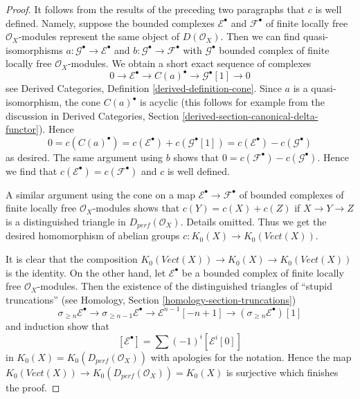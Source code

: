 \begin{proof}
\medskip\noindent
It follows from the results of the preceding two paragraphs that $c$
is well defined. Namely, suppose the bounded complexes
$\mathcal{E}^\bullet$ and $\mathcal{F}^\bullet$ of finite locally free
$\mathcal{O}_X$-modules represent the same object of $D(\mathcal{O}_X)$.
Then we can find quasi-isomorphisms
$a : \mathcal{G}^\bullet \to \mathcal{E}^\bullet$ and
$b : \mathcal{G}^\bullet \to \mathcal{F}^\bullet$
with $\mathcal{G}^\bullet$ bounded complex of finite locally free
$\mathcal{O}_X$-modules.
We obtain a short exact sequence of complexes
$$
0 \to \mathcal{E}^\bullet \to C(a)^\bullet \to \mathcal{G}^\bullet[1] \to 0
$$
see Derived Categories, Definition \ref{derived-definition-cone}.
Since $a$ is a quasi-isomorphism, the cone $C(a)^\bullet$ is
acyclic (this follows for example from the discussion in
Derived Categories, Section \ref{derived-section-canonical-delta-functor}).
Hence
$$
0 = c(C(a)^\bullet) = c(\mathcal{E}^\bullet) + c(\mathcal{G}^\bullet[1]) =
c(\mathcal{E}^\bullet) - c(\mathcal{G}^\bullet)
$$
as desired. The same argument using $b$ shows that
$0 = c(\mathcal{F}^\bullet) - c(\mathcal{G}^\bullet)$.
Hence we find that $c(\mathcal{E}^\bullet) = c(\mathcal{F}^\bullet)$
and $c$ is well defined.

\medskip\noindent
A similar argument using the cone on a map
$\mathcal{E}^\bullet \to \mathcal{F}^\bullet$
of bounded complexes of finite locally free $\mathcal{O}_X$-modules
shows that $c(Y) = c(X) + c(Z)$ if $X \to Y \to Z$ is a distinguished triangle
in $D_{perf}(\mathcal{O}_X)$. Details omitted.
Thus we get the desired homomorphism
of abelian groups $c : K_0(X) \to K_0(\textit{Vect}(X))$.

\medskip\noindent
It is clear that the composition
$K_0(\textit{Vect}(X)) \to K_0(X) \to K_0(\textit{Vect}(X))$
is the identity. On the other hand, let $\mathcal{E}^\bullet$
be a bounded complex of finite locally free $\mathcal{O}_X$-modules.
Then the existence of the distinguished triangles
of ``stupid truncations''
(see Homology, Section \ref{homology-section-truncations})
$$
\sigma_{\geq n}\mathcal{E}^\bullet \to
\sigma_{\geq n - 1}\mathcal{E}^\bullet \to
\mathcal{E}^{n - 1}[-n + 1] \to
(\sigma_{\geq n}\mathcal{E}^\bullet)[1]
$$
and induction show that
$$
[\mathcal{E}^\bullet] = \sum (-1)^i[\mathcal{E}^i[0]]
$$
in $K_0(X) = K_0(D_{perf}(\mathcal{O}_X))$ with apologies for the notation.
Hence the map $K_0(\textit{Vect}(X)) \to K_0(D_{perf}(\mathcal{O}_X)) = K_0(X)$
is surjective which finishes the proof.
\end{proof}

